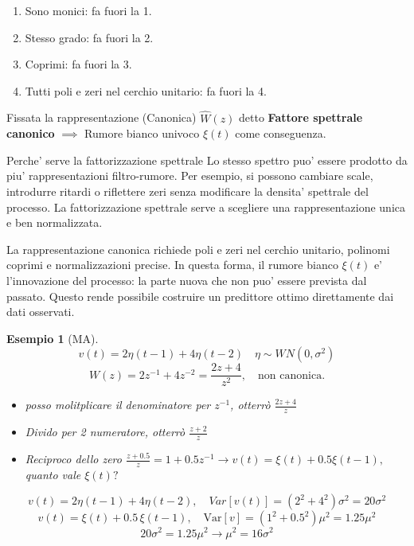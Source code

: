 \documentclass[11pt,a4paper]{article}
\newtheorem{example}{Esempio}
\begin{document}
\begin{enumerate}
  \item Sono monici: fa fuori la 1.
  \item Stesso grado: fa fuori la 2.
  \item Coprimi: fa fuori la 3.
  \item Tutti poli e zeri nel cerchio unitario: fa fuori la 4.
\end{enumerate}

Fissata la rappresentazione (Canonica) $\hat{W}(z)$ detto \textbf{Fattore spettrale canonico} $\implies$ Rumore bianco univoco $\xi(t)$ come conseguenza. 

\begin{spiegazione}{Perche' serve la fattorizzazione spettrale}
Lo stesso spettro puo' essere prodotto da piu' rappresentazioni filtro-rumore. Per esempio, si possono cambiare scale, introdurre ritardi o riflettere zeri senza modificare la densita' spettrale del processo. La fattorizzazione spettrale serve a scegliere una rappresentazione unica e ben normalizzata.

La rappresentazione canonica richiede poli e zeri nel cerchio unitario, polinomi coprimi e normalizzazioni precise. In questa forma, il rumore bianco $\xi(t)$ e' l'innovazione del processo: la parte nuova che non puo' essere prevista dal passato. Questo rende possibile costruire un predittore ottimo direttamente dai dati osservati.
\end{spiegazione}

\begin{example}[MA]
\[
v(t)=2\eta(t-1)+4\eta(t-2) \quad \eta \sim WN(0, \sigma^2)
\]
\[
 W(z)=2z^{-1}+4z^{-2} = \frac{2z+4}{z^2}, \quad \text{non canonica}.
\]

\begin{itemize}
    \item posso molitplicare il denominatore per $z^{-1}$, otterrò $\frac{2z+4}{z}$
    \item Divido per 2 numeratore, otterrò $\frac{z+2}{z}$
    \item Reciproco dello zero $\frac{z+0.5}{z} = 1+ 0.5z^{-1} \rightarrow v(t) = \xi(t)+0.5\xi(t-1),$ quanto vale $\xi(t) ?$ 
\end{itemize}

\[
v(t)=2\eta(t-1)+4\eta(t-2), \quad Var[v(t)] = (2^2+4^2)\sigma^2 = 20\sigma^2
\]
\[
v(t)=\xi(t)+0.5\,\xi(t-1),\quad \mathrm{Var}[v]=(1^2+0.5^2)\mu^2 =1.25\mu^2
\]
\[
20\sigma^2 = 1.25\mu^2 \rightarrow \mu^2 =16\sigma^2
\]
\end{example}
\end{document}
